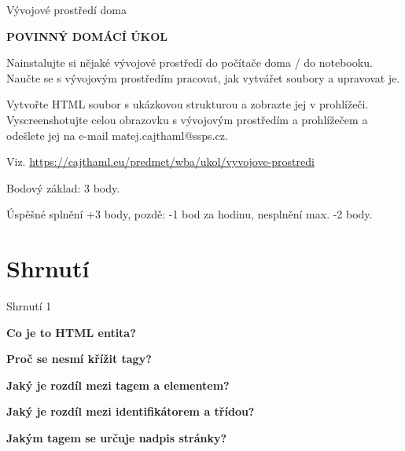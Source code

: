 \documentclass[aspectratio=169]{beamer}
\begin{document}
\begin{frame}{Vývojové prostředí doma}
    \begin{cardTiny}
        \begin{center}
            \textbf{POVINNÝ DOMÁCÍ ÚKOL}
        \end{center}
        \begin{flushleft}
            Nainstalujte si nějaké vývojové prostředí do počítače doma / do notebooku. Naučte se s vývojovým prostředím pracovat, jak vytvářet soubory a upravovat je.

            Vytvořte HTML soubor s ukázkovou strukturou a zobrazte jej v prohlížeči. Vyscreenshotujte celou obrazovku s vývojovým prostředím a prohlížečem a odešlete jej na e-mail matej.cajthaml@ssps.cz. 
            
            \vspace{2ex}
            Viz. \href{https://cajthaml.eu/predmet/wba/ukol/vyvojove-prostredi}{https://cajthaml.eu/predmet/wba/ukol/vyvojove-prostredi}

            Bodový základ: 3 body.

            Úspěšné splnění +3 body, pozdě: -1 bod za hodinu, nesplnění max. -2 body. 
        \end{flushleft}
    \end{cardTiny}
\end{frame}




\section{Shrnutí}
\begin{frame}{Shrnutí 1}
    \begin{cardTiny}
        \begin{center}
            \textbf{Co je to HTML entita?}
        \end{center}
    \end{cardTiny}
    \begin{cardTiny}
        \begin{center}
            \textbf{Proč se nesmí křížit tagy?}
        \end{center}
    \end{cardTiny}
    \begin{cardTiny}
        \begin{center}
            \textbf{Jaký je rozdíl mezi tagem a elementem?}
        \end{center}
    \end{cardTiny}
    \begin{cardTiny}
        \begin{center}
            \textbf{Jaký je rozdíl mezi identifikátorem a třídou?}
        \end{center}
    \end{cardTiny}
    \begin{cardTiny}
        \begin{center}
            \textbf{Jakým tagem se určuje nadpis stránky?}
        \end{center}
    \end{cardTiny}
\end{frame}
\end{document}
